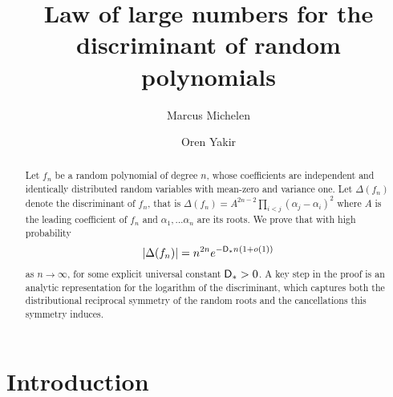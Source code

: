 \documentclass[11pt]{amsart}
\theoremstyle{remark}
\theoremstyle{definition}
\begin{document}
	
	
	
    \title[Law of large numbers for the discriminant of random polynomials]{Law of large numbers for the discriminant of random polynomials}

    \author[Marcus Michelen]{Marcus Michelen}
    \author[Oren Yakir]{Oren Yakir}
    \address{Department of Mathematics, Statistics, and Computer Science, University of Illinois, Chicago. }
    \address{Department of mathematics, Stanford University.}

	\maketitle

	\begin{abstract}
    Let $f_n$ be a random polynomial of degree $n$, whose coefficients are independent and identically distributed random variables with mean-zero and variance one. Let $\Delta(f_n)$ denote the discriminant of $f_n$, that is $\Delta(f_n) = A^{2n-2}\prod_{i < j} (\alpha_j - \alpha_i)^2$ where $A$ is the leading coefficient of $f_n$ and $\alpha_1,\ldots\alpha_n$ are its roots.
    We prove that with high probability $$|\Delta(f_n)| = n^{2n} e^{-{\sf D}_\ast n(1+o(1))}$$ as $n\to \infty$, for some explicit universal
    constant ${\sf D}_\ast>0$. A key step in the proof is an analytic representation for the logarithm of the discriminant, which captures both the distributional reciprocal symmetry of the random roots and the cancellations this symmetry induces.
	\end{abstract}

    \pagestyle{plain}
    
	\section{Introduction}
	
\end{document}

